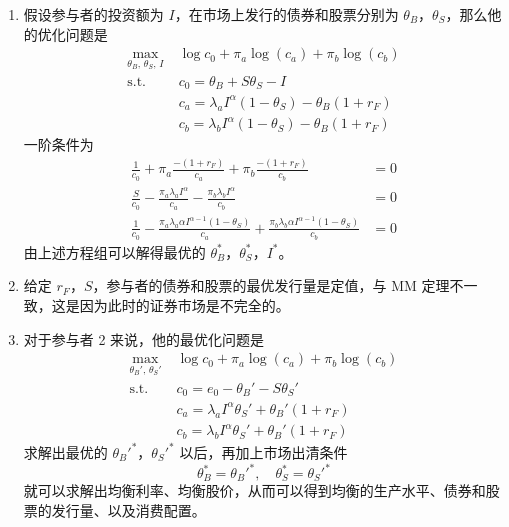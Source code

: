 \begin{solution}
\begin{enumerate}[label=(\alph*)]
    \item 假设参与者的投资额为 $I$，在市场上发行的债券和股票分别为 $\theta_{B}$，$\theta_{S}$，那么他的优化问题是
    \[
        \begin{aligned}
            \max_{\theta_{B},\,\theta_{S},\,I}\;&\log c_{0}+\pi_{a}\log(c_{a})+\pi_{b}\log(c_{b})\\
            \text{s.t.}\;&c_{0}=\theta_{B}+S\theta_{S}-I\\
            &c_{a}=\lambda_{a}I^{\alpha}(1-\theta_{S})-\theta_{B}(1+r_{F})\\
            &c_{b}=\lambda_{b}I^{\alpha}(1-\theta_{S})-\theta_{B}(1+r_{F})
        \end{aligned}
    \]
    一阶条件为
    \[
        \begin{aligned}
            \frac{1}{c_{0}}+\pi_{a}\frac{-(1+r_{F})}{c_{a}}+\pi_{b}\frac{-(1+r_{F})}{c_{b}}&=0\\
            \frac{S}{c_{0}}-\frac{\pi_{a}\lambda_{a}I^{\alpha}}{c_{a}}-\frac{\pi_{b}\lambda_{b}I^{\alpha}}{c_{b}}&=0\\
            \frac{1}{c_{0}}-\frac{\pi_{a}\lambda_{a}\alpha I^{\alpha-1}(1-\theta_{S})}{c_{a}}+\frac{\pi_{b}\lambda_{b}\alpha I^{\alpha-1}(1-\theta_{S})}{c_{b}}&=0
        \end{aligned}
    \]
    由上述方程组可以解得最优的 $\theta_{B}^{*}$，$\theta_{S}^{*}$，$I^{*}$。
    \item 给定 $r_{F}$，$S$，参与者的债券和股票的最优发行量是定值，与 MM 定理不一致，这是因为此时的证券市场是不完全的。
    \item 对于参与者 2 来说，他的最优化问题是
    \[
        \begin{aligned}
            \max_{\theta_{B}',\,\theta_{S}'}\;&\log c_{0}+\pi_{a}\log(c_{a})+\pi_{b}\log(c_{b})\\
            \text{s.t.}\;&c_{0}=e_{0}-\theta_{B}'-S\theta_{S}'\\
            &c_{a}=\lambda_{a}I^{\alpha}\theta_{S}'+\theta_{B}'(1+r_{F})\\
            &c_{b}=\lambda_{b}I^{\alpha}\theta_{S}'+\theta_{B}'(1+r_{F})
        \end{aligned}
    \]
    求解出最优的 $\theta_{B}'^{*}$，$\theta_{S}'^{*}$ 以后，再加上市场出清条件
    \[
        \theta_{B}^{*}=\theta_{B}'^{*},\quad\theta_{S}^{*}=\theta_{S}'^{*}
    \]
    就可以求解出均衡利率、均衡股价，从而可以得到均衡的生产水平、债券和股票的发行量、以及消费配置。
\end{enumerate}
\end{solution}

